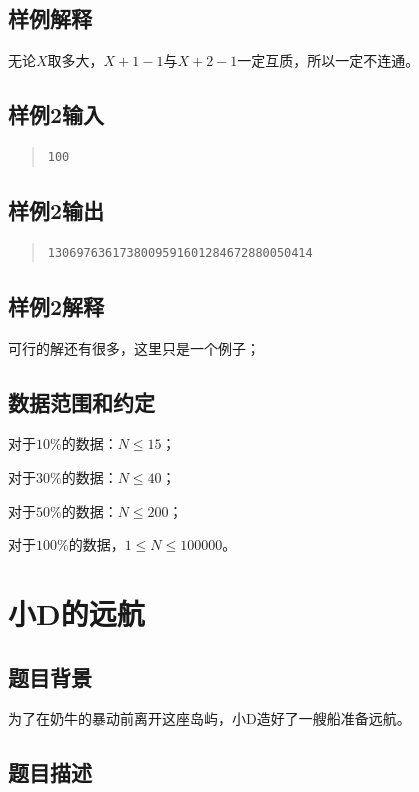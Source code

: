 \documentclass[12pt, a4paper]{article}
\begin{document}
\subsection{样例解释}

	无论$X$取多大，$X+1-1$与$X+2-1$一定互质，所以一定不连通。

\subsection{样例2输入}
\begin{quote}
\begin{verbatim}
100
\end{verbatim}
\end{quote}
\subsection{样例2输出}
\begin{quote}
\begin{verbatim}
1306976361738009591601284672880050414
\end{verbatim}
\end{quote}

\subsection{样例2解释}

	可行的解还有很多，这里只是一个例子；

\subsection{数据范围和约定}

	对于$10\%$的数据：$N \leq 15$；

	对于$30\%$的数据：$N \leq 40$；
	
	对于$50\%$的数据：$N \leq 200$；

	对于$100\%$的数据，$1 \leq N \leq 100000$。

\newpage
\section{小D的远航}
\subsection{题目背景}

	为了在奶牛的暴动前离开这座岛屿，小D造好了一艘船准备远航。

\subsection{题目描述}
\end{document}
